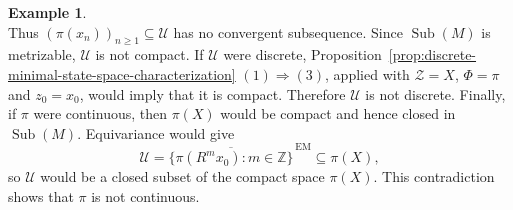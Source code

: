 \documentclass[12pt]{amsart} %
\theoremstyle{plain}
\theoremstyle{definition}
\newtheorem{example}[theorem]{Example}
\DeclareMathOperator{\Sub}{Sub}
\begin{document}
\begin{example}
$$$$
Thus
$(\pi(x_n))_{n\geq1}\subseteq\mathcal U$ has no convergent
subsequence. Since
$\Sub(M)$ is metrizable, $\mathcal U$ is not compact. If $\mathcal U$
were discrete,
Proposition~\ref{prop:discrete-minimal-state-space-characterization} $(1)\Rightarrow(3)$,
applied with $\mathcal Z=X$, $\Phi=\pi$ and $z_0=x_0$,
would imply that it is compact. Therefore $\mathcal U$ is
not discrete. Finally, if $\pi$ were continuous, then $\pi(X)$ would be
compact and hence closed in $\Sub(M)$. Equivariance would give
$$
\mathcal U
=\overline{\{\pi(R^mx_0):m\in\mathbb Z\}}^{\,\mathrm{EM}}
\subseteq\pi(X),
$$
so $\mathcal U$ would be a closed subset of the compact space $\pi(X)$.
This contradiction shows that $\pi$ is not continuous.
\end{example}


\end{document}

